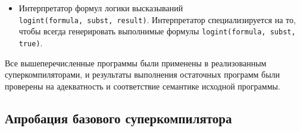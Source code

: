 \begin{itemize}
 \item Интерпретатор формул логики высказываний \\ \lstinline{logint(formula, subst, result)}.
       Интерпретатор специализируется на то, чтобы всегда генерировать выполнимые формулы
       \lstinline{logint(formula, subst, true)}.
\end{itemize}

Все вышеперечисленные программы были применены в реализованным суперкомпиляторами, и результаты
выполнения остаточных программ были проверены на адекватность и соответствие семантике исходной программы.

\subsection{Апробация базового суперкомпилятора \ukanren}



